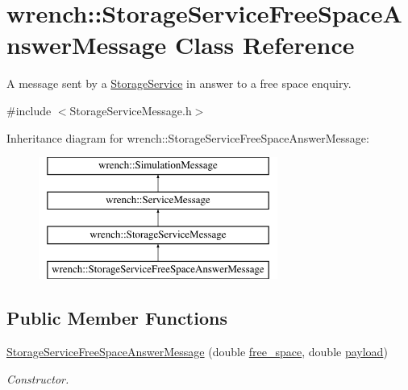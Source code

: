 \hypertarget{classwrench_1_1_storage_service_free_space_answer_message}{}\section{wrench\+:\+:Storage\+Service\+Free\+Space\+Answer\+Message Class Reference}
\label{classwrench_1_1_storage_service_free_space_answer_message}


A message sent by a \hyperlink{classwrench_1_1_storage_service}{Storage\+Service} in answer to a free space enquiry.  




{\ttfamily \#include $<$Storage\+Service\+Message.\+h$>$}

Inheritance diagram for wrench\+:\+:Storage\+Service\+Free\+Space\+Answer\+Message\+:\begin{figure}[H]
\begin{center}
\leavevmode
\includegraphics[height=4.000000cm]{classwrench_1_1_storage_service_free_space_answer_message}
\end{center}
\end{figure}
\subsection*{Public Member Functions}
\begin{DoxyCompactItemize}
\item 
\hyperlink{classwrench_1_1_storage_service_free_space_answer_message_a854b146de134b69b17904ae3b13deaf4}{Storage\+Service\+Free\+Space\+Answer\+Message} (double \hyperlink{classwrench_1_1_storage_service_free_space_answer_message_a99963ea611b243cb0a31cf01998e75da}{free\+\_\+space}, double \hyperlink{classwrench_1_1_simulation_message_a914f2732713f7c02898e66f05a7cb8a1}{payload})
\begin{DoxyCompactList}\small\item\em Constructor. \end{DoxyCompactList}\end{DoxyCompactItemize}

